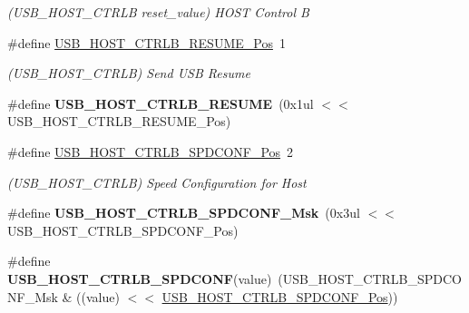 \begin{DoxyCompactItemize}
\begin{DoxyCompactList}\small\item\em (U\+S\+B\+\_\+\+H\+O\+S\+T\+\_\+\+C\+T\+R\+L\+B reset\+\_\+value) H\+O\+S\+T Control B \end{DoxyCompactList}\item 
\hypertarget{group___s_a_m_l21___u_s_b_gab5a679b92871cc0f3ba948f3d8191ec6}{}\#define \hyperlink{group___s_a_m_l21___u_s_b_gab5a679b92871cc0f3ba948f3d8191ec6}{U\+S\+B\+\_\+\+H\+O\+S\+T\+\_\+\+C\+T\+R\+L\+B\+\_\+\+R\+E\+S\+U\+M\+E\+\_\+\+Pos}~1\label{group___s_a_m_l21___u_s_b_gab5a679b92871cc0f3ba948f3d8191ec6}

\begin{DoxyCompactList}\small\item\em (U\+S\+B\+\_\+\+H\+O\+S\+T\+\_\+\+C\+T\+R\+L\+B) Send U\+S\+B Resume \end{DoxyCompactList}\item 
\hypertarget{group___s_a_m_l21___u_s_b_ga5f5b751377196419c6a558b5b2affb5c}{}\#define {\bfseries U\+S\+B\+\_\+\+H\+O\+S\+T\+\_\+\+C\+T\+R\+L\+B\+\_\+\+R\+E\+S\+U\+M\+E}~(0x1ul $<$$<$ U\+S\+B\+\_\+\+H\+O\+S\+T\+\_\+\+C\+T\+R\+L\+B\+\_\+\+R\+E\+S\+U\+M\+E\+\_\+\+Pos)\label{group___s_a_m_l21___u_s_b_ga5f5b751377196419c6a558b5b2affb5c}

\item 
\hypertarget{group___s_a_m_l21___u_s_b_gae5052bc689326f7ae2f3d3414ab4c294}{}\#define \hyperlink{group___s_a_m_l21___u_s_b_gae5052bc689326f7ae2f3d3414ab4c294}{U\+S\+B\+\_\+\+H\+O\+S\+T\+\_\+\+C\+T\+R\+L\+B\+\_\+\+S\+P\+D\+C\+O\+N\+F\+\_\+\+Pos}~2\label{group___s_a_m_l21___u_s_b_gae5052bc689326f7ae2f3d3414ab4c294}

\begin{DoxyCompactList}\small\item\em (U\+S\+B\+\_\+\+H\+O\+S\+T\+\_\+\+C\+T\+R\+L\+B) Speed Configuration for Host \end{DoxyCompactList}\item 
\hypertarget{group___s_a_m_l21___u_s_b_gad95fad89a2fe454c3f9ca72f890c56da}{}\#define {\bfseries U\+S\+B\+\_\+\+H\+O\+S\+T\+\_\+\+C\+T\+R\+L\+B\+\_\+\+S\+P\+D\+C\+O\+N\+F\+\_\+\+Msk}~(0x3ul $<$$<$ U\+S\+B\+\_\+\+H\+O\+S\+T\+\_\+\+C\+T\+R\+L\+B\+\_\+\+S\+P\+D\+C\+O\+N\+F\+\_\+\+Pos)\label{group___s_a_m_l21___u_s_b_gad95fad89a2fe454c3f9ca72f890c56da}

\item 
\hypertarget{group___s_a_m_l21___u_s_b_ga25a4ce317b15a64b840749d499f2ae5a}{}\#define {\bfseries U\+S\+B\+\_\+\+H\+O\+S\+T\+\_\+\+C\+T\+R\+L\+B\+\_\+\+S\+P\+D\+C\+O\+N\+F}(value)~(U\+S\+B\+\_\+\+H\+O\+S\+T\+\_\+\+C\+T\+R\+L\+B\+\_\+\+S\+P\+D\+C\+O\+N\+F\+\_\+\+Msk \& ((value) $<$$<$ \hyperlink{group___s_a_m_l21___u_s_b_gae5052bc689326f7ae2f3d3414ab4c294}{U\+S\+B\+\_\+\+H\+O\+S\+T\+\_\+\+C\+T\+R\+L\+B\+\_\+\+S\+P\+D\+C\+O\+N\+F\+\_\+\+Pos}))\label{group___s_a_m_l21___u_s_b_ga25a4ce317b15a64b840749d499f2ae5a}


\end{DoxyCompactItemize}
